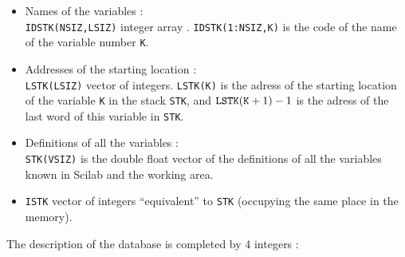 %
\begin{itemize}

\item Names of the variables : \\
{\tt IDSTK(NSIZ,LSIZ)} integer array .  
{\tt IDSTK(1:NSIZ,K)} 
is the code of the name of the variable number {\tt K}.

\item Addresses of the starting location : \\
{\tt LSTK(LSIZ)}  vector of 
integers.     {\tt LSTK(K)} is the adress
of the starting location of the variable {\tt K} in the stack
 {\tt STK}, and ${\tt LSTK}({\tt K}+1)-1$ is the adress
of the last word of this variable in {\tt STK}.

\item Definitions of all the variables : \\
{\tt  STK(VSIZ)}  is the double float vector 
of the definitions of all the variables known in Scilab and the working area.

\item{\tt ISTK} vector of integers ``equivalent'' to {\tt STK} (occupying
the same place in the memory).

\end{itemize}
%

The description of the database is completed by 4 integers :



